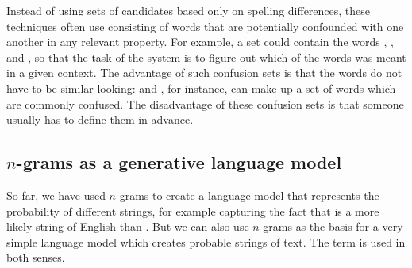 




Instead of using sets of candidates based only on spelling differences,
these techniques often use  consisting of words that
are potentially confounded with one another in any relevant property.  
For example, a set could
contain the words , , and
, so that the task of the system is to figure out which of
the words was meant in a given context.  The advantage of such
confusion sets is that the words do not have to be similar-looking:
 and , for instance, can make up a set
of words which are commonly confused.
The disadvantage of these confusion sets is that someone usually has to
define them in advance.

\subsection{$n$-grams as a generative language model} \label{sec:ngramgen}

So far, we have used $n$-grams to create a language model that represents the probability of different strings, for example capturing the fact that  is a more likely string of English than .  But we can also use $n$-grams as the basis for a very simple  language model which creates probable strings of text.  The term  is used in both senses.

